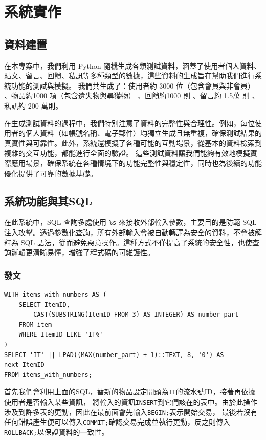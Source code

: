 \documentclass[12pt,a4paper]{article}
\begin{document}
\section{系統實作}

\subsection{資料建置}
在本專案中，我們利用 Python 隨機生成各類測試資料，涵蓋了使用者個人資料、貼文、留言、回饋、私訊等多種類型的數據，這些資料的生成旨在幫助我們進行系統功能的測試與模擬。
我們共生成了：使用者約 3000 位（包含會員與非會員）
、物品約1000 項（包含遺失物與尋獲物）
、回饋約1000 則
、留言約 1.5萬 則
、私訊約 200 萬則。

在生成測試資料的過程中，我們特別注意了資料的完整性與合理性。例如，每位使用者的個人資料（如帳號名稱、電子郵件）均獨立生成且無重複，確保測試結果的真實性與可靠性。此外，系統還模擬了各種可能的互動場景，從基本的資料檢索到複雜的交互功能，都能進行全面的驗證。
這些測試資料讓我們能夠有效地模擬實際應用場景，確保系統在各種情境下的功能完整性與穩定性，同時也為後續的功能優化提供了可靠的數據基礎。


\subsection{系統功能與其SQL}
在此系統中，SQL 查詢多處使用 \texttt{\%s} 來接收外部輸入參數，主要目的是防範 SQL 注入攻擊。透過參數化查詢，所有外部輸入會被自動轉譯為安全的資料，不會被解釋為 SQL 語法，從而避免惡意操作。這種方式不僅提高了系統的安全性，也使查詢邏輯更清晰易懂，增強了程式碼的可維護性。

\subsubsection{發文}
\begin{lstlisting}
WITH items_with_numbers AS (
    SELECT ItemID,
        CAST(SUBSTRING(ItemID FROM 3) AS INTEGER) AS number_part
    FROM item
    WHERE ItemID LIKE 'IT%'
)
SELECT 'IT' || LPAD((MAX(number_part) + 1)::TEXT, 8, '0') AS next_ItemID
FROM items_with_numbers;    
\end{lstlisting}

首先我們會利用上面的SQL，替新的物品設定開頭為\texttt{IT}的流水號ID，接著再依據使用者是否輸入某些資訊，
將輸入的資訊\texttt{INSERT}到它們該在的表中。由於此操作涉及到許多表的更動，因此在最前面會先輸入\texttt{BEGIN;}表示開始交易，
最後若沒有任何錯誤產生便可以傳入\texttt{COMMIT;}確認交易完成並執行更動，反之則傳入\texttt{ROLLBACK;}以保證資料的一致性。
\end{document}
